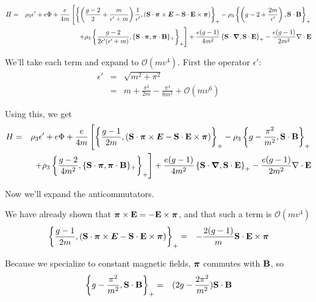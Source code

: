 \begin{eqnarray*}
H &=& \rho_3 \epsilon' + e\Phi +\frac{e}{4m} 
	\left [ \left \{ 	\left (\frac{g-2}{2} + \frac{m}{\epsilon' + m} \right )\frac{1}{\epsilon'}, 
				(\mathbf{S} \cdot \mbox{\boldmath$ \pi $} \times \mbox{\boldmath$ E $} - \mathbf{S} \cdot \mathbf{E} \times \mbox{\boldmath$ \pi $})
		\right \}_+
		- \rho_3 \left \{ \left ( g-2 + \frac{2m}{\epsilon'} \right ), \mathbf{S} \cdot \mathbf{B} \right \}_+
	\right.	\\
	&& \left.
		+\rho_3 \left \{ \frac{g-2}{2\epsilon' (\epsilon'+m)}, 
			\{\mathbf{S} \cdot \mbox{\boldmath$ \pi $}, \mbox{\boldmath$ \pi $} \cdot \mathbf{B} \}_+ \right \}_+
	\right ]
	+ \frac{e(g-1)}{4m^2}\left \{ \mathbf{S} \cdot \mbox{\boldmath$ \nabla $}, \mathbf{S} \cdot \mathbf{E} \right \}_+
	- \frac{e(g-1)}{2m^2} \mathbf{\nabla} \cdot \mathbf{E}
\end{eqnarray*}


We'll take each term and expand to $\mathcal{O}(mv^4)$. First the operator $\epsilon'$: 
\begin{eqnarray*}
\epsilon' 	
	&=& 	\sqrt{m^2 + \pi^2}						\\
	&=&	m + \frac{\pi^2}{2m} - \frac{\pi^4}{8m^2} +\mathcal{O}(mv^6)
\end{eqnarray*}

Using this, we get
\begin{eqnarray*}
H &=& \rho_3 \epsilon' + e\Phi +\frac{e}{4m} 
	\left [ \left \{ 	\frac{g-1}{2m}, 
				(\mathbf{S} \cdot \mbox{\boldmath$ \pi $} \times \mbox{\boldmath$ E $} - \mathbf{S} \cdot \mathbf{E} \times \mbox{\boldmath$ \pi $})
		\right \}_+
		- \rho_3 \left \{ g -\frac{\pi^2}{m^2} , \mathbf{S} \cdot \mathbf{B} \right \}_+
	\right.	\\
	&& \left.
		+\rho_3 \left \{ \frac{g-2}{4m^2}, 
			\{\mathbf{S} \cdot \mbox{\boldmath$ \pi $}, \mbox{\boldmath$ \pi $} \cdot \mathbf{B} \}_+ \right \}_+
	\right ]
	+ \frac{e(g-1)}{4m^2}\left \{ \mathbf{S} \cdot \mbox{\boldmath$ \nabla $}, \mathbf{S} \cdot \mathbf{E} \right \}_+
	- \frac{e(g-1)}{2m^2} \mathbf{\nabla} \cdot \mathbf{E}
\end{eqnarray*}

Now we'll expand the anticommutators.



We have already shown that $\mbox{\boldmath$ \pi $} \times \mathbf{E} = - \mathbf{E} \times \mbox{\boldmath$ \pi $}$, and that such a term is $\mathcal{O}(mv^4)$
\begin{eqnarray*}
\left \{ 	\frac{g-1}{2m}, 
				(\mathbf{S} \cdot \mbox{\boldmath$ \pi $} \times \mbox{\boldmath$ E $} - \mathbf{S} \cdot \mathbf{E} \times \mbox{\boldmath$ \pi $})
		\right \}_+
	&=&			-\frac{2(g-1)}{m} 	\mathbf{S} \cdot \mathbf{E} \times \mbox{\boldmath$ \pi $}
\end{eqnarray*}

Because we specialize to constant magnetic fields, $\mbox{\boldmath$ \pi $}$ commutes with $\mathbf{B}$, so 
\begin{eqnarray*}
\left \{ g -\frac{\pi^2}{m^2} , \mathbf{S} \cdot \mathbf{B} \right \}_+
	&=&	(2g - \frac{2\pi^2}{m^2}) \mathbf{S} \cdot \mathbf{B}
\end{eqnarray*}

